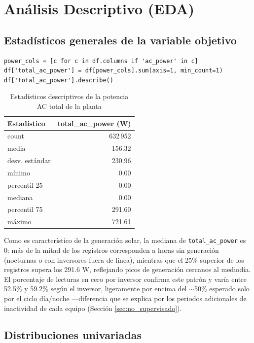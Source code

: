 \section{Análisis Descriptivo (EDA)}
\label{sec:descriptivo}

\subsection*{Estadísticos generales de la variable objetivo}

\begin{verbatim}
power_cols = [c for c in df.columns if 'ac_power' in c]
df['total_ac_power'] = df[power_cols].sum(axis=1, min_count=1)
df['total_ac_power'].describe()
\end{verbatim}

\begin{table}[H]
\centering
\begin{tabular}{lr}
\toprule
\textbf{Estadístico} & \textbf{total\_ac\_power (W)} \\
\midrule
count & 632\,952 \\
media & 156.32 \\
desv. estándar & 230.96 \\
mínimo & 0.00 \\
percentil 25 & 0.00 \\
mediana & 0.00 \\
percentil 75 & 291.60 \\
máximo & 721.61 \\
\bottomrule
\end{tabular}
\caption{Estadísticos descriptivos de la potencia AC total de la planta}
\end{table}

Como es característico de la generación solar, la mediana de \texttt{total\_ac\_power} es 0: más de la mitad de los registros corresponden a horas sin generación (nocturnas o con inversores fuera de línea), mientras que el 25\% superior de los registros supera los 291.6 W, reflejando picos de generación cercanos al mediodía. El porcentaje de lecturas en cero por inversor confirma este patrón y varía entre 52.5\% y 59.2\% según el inversor, ligeramente por encima del $\sim$50\% esperado solo por el ciclo día/noche —diferencia que se explica por los periodos adicionales de inactividad de cada equipo (Sección \ref{sec:no_supervisado}).

\subsection*{Distribuciones univariadas}

